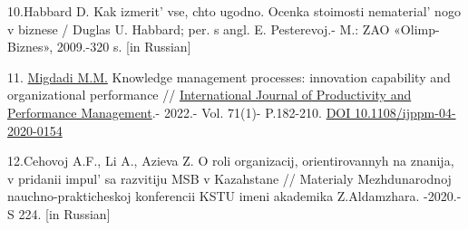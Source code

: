 \begin{references}
10.Habbard D. Kak izmerit'{} vse, chto ugodno. Ocenka
stoimosti nematerial' nogo v biznese / Duglas U. Habbard;
per. s angl. E. Pesterevoj.- M.: ZAO «Olimp-Biznes», 2009.-320 s.
{[}in Russian{]}

11.
\href{https://www.emerald.com/insight/search?q=Mahmoud\%20Mohammad\%20Migdadi}{Migdadi
M.M.} Knowledge management processes: innovation capability and
organizational performance //
\href{https://www.emerald.com/insight/publication/issn/1741-0401}{International
Journal of Productivity and Performance Management}.- 2022.- Vol. 71(1)-
P.182-210. \href{https://doi.org/10.1108/ijppm-04-2020-0154}{DOI
10.1108/ijppm-04-2020-0154}

12.Cehovoj A.F., Li A., Azieva Z. O roli organizacij, orientirovannyh na
znanija, v pridanii impul' sa razvitiju MSB v Kazahstane
// Materialy Mezhdunarodnoj nauchno-prakticheskoj konferencii KSTU imeni
akademika Z.Aldamzhara. -2020.- S 224. {[}in Russian{]}
\end{references}

